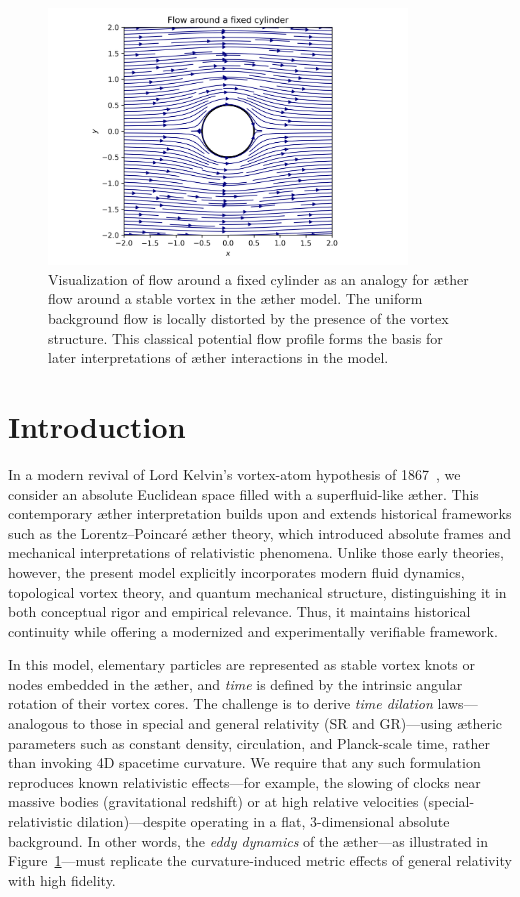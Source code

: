 \begin{figure}[htbp]
    \centering
    \includegraphics[width=0.85\textwidth]{02_cylinder_flow}
    \caption{Visualization of flow around a fixed cylinder as an analogy for æther flow around a stable vortex in the æther model. The uniform background flow is locally distorted by the presence of the vortex structure. This classical potential flow profile forms the basis for later interpretations of æther interactions in the model.}
    \label{fig:cylinderflow}
\end{figure}

\section{Introduction}
In a modern revival of Lord Kelvin's vortex-atom hypothesis of 1867~\cite{Kelvin1867-vortex}, we consider an absolute Euclidean space filled with a superfluid-like æther. This contemporary æther interpretation builds upon and extends historical frameworks such as the Lorentz–Poincaré æther theory, which introduced absolute frames and mechanical interpretations of relativistic phenomena. Unlike those early theories, however, the present model explicitly incorporates modern fluid dynamics, topological vortex theory, and quantum mechanical structure, distinguishing it in both conceptual rigor and empirical relevance. Thus, it maintains historical continuity while offering a modernized and experimentally verifiable framework.

In this model, elementary particles are represented as stable vortex knots or nodes embedded in the æther, and \emph{time} is defined by the intrinsic angular rotation of their vortex cores. The challenge is to derive \emph{time dilation} laws—analogous to those in special and general relativity (SR and GR)—using ætheric parameters such as constant density, circulation, and Planck-scale time, rather than invoking 4D spacetime curvature. We require that any such formulation reproduces known relativistic effects—for example, the slowing of clocks near massive bodies (gravitational redshift) or at high relative velocities (special-relativistic dilation)—despite operating in a flat, 3-dimensional absolute background. In other words, the \emph{eddy dynamics} of the æther—as illustrated in Figure~\ref{fig:cylinderflow}—must replicate the curvature-induced metric effects of general relativity with high fidelity.

